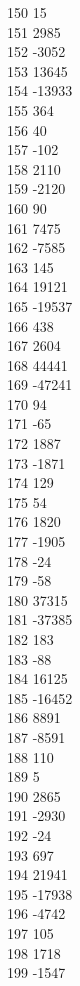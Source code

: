 { 150	15 \\
 151	2985 \\
 152	-3052 \\
 153	13645 \\
 154	-13933 \\
 155	364 \\
 156	40 \\
 157	-102 \\
 158	2110 \\
 159	-2120 \\
 160	90 \\
 161	7475 \\
 162	-7585 \\
 163	145 \\
 164	19121 \\
 165	-19537 \\
 166	438 \\
 167	2604 \\
 168	44441 \\
 169	-47241 \\
 170	94 \\
 171	-65 \\
 172	1887 \\
 173	-1871 \\
 174	129 \\
 175	54 \\
 176	1820 \\
 177	-1905 \\
 178	-24 \\
 179	-58 \\
 180	37315 \\
 181	-37385 \\
 182	183 \\
 183	-88 \\
 184	16125 \\
 185	-16452 \\
 186	8891 \\
 187	-8591 \\
 188	110 \\
 189	5 \\
 190	2865 \\
 191	-2930 \\
 192	-24 \\
 193	697 \\
 194	21941 \\
 195	-17938 \\
 196	-4742 \\
 197	105 \\
 198	1718 \\
 199	-1547 \\
}
